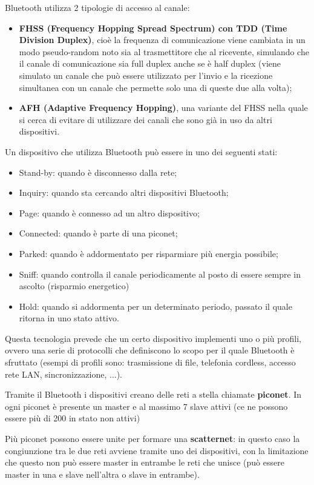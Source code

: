 Bluetooth utilizza 2 tipologie di accesso al canale:
\begin {itemize}
  \item \textbf{FHSS (Frequency Hopping Spread Spectrum) con TDD (Time Division
        Duplex)}, cioè la frequenza di comunicazione viene cambiata in un modo
        pseudo-random noto sia al trasmettitore che al ricevente, simulando che
        il canale di comunicazione sia full duplex anche se è half duplex (viene
        simulato un canale che può essere utilizzato per l'invio e la ricezione
        simultanea con un canale che permette solo una di queste due alla volta);
  \item \textbf{AFH (Adaptive Frequency Hopping)}, una variante del FHSS nella
        quale si cerca di evitare di utilizzare dei canali che sono già in uso
        da altri dispositivi.
\end{itemize}

Un dispositivo che utilizza Bluetooth può essere in uno dei seguenti stati:
\begin{itemize}
  \item Stand-by: quando è disconnesso dalla rete;
  \item Inquiry: quando sta cercando altri dispositivi Bluetooth;
  \item Page: quando è connesso ad un altro dispositivo;
  \item Connected: quando è parte di una piconet;
  \item Parked: quando è addormentato per risparmiare più energia possibile;
  \item Sniff: quando controlla il canale periodicamente al posto di essere
        sempre in ascolto (risparmio energetico)
  \item Hold: quando si addormenta per un determinato periodo, passato il quale
        ritorna in uno stato attivo.
\end{itemize}

Questa tecnologia prevede che un certo dispositivo implementi uno o più profili,
ovvero una serie di protocolli che definiscono lo scopo per il quale Bluetooth è
sfruttato (esempi di profili sono: trasmissione di file, telefonia cordless,
accesso rete LAN, sincronizzazione, ...).

Tramite il Bluetooth i dispositivi creano delle reti a stella chiamate
\textbf{piconet}. In ogni piconet è presente un master e al massimo 7 slave
attivi (ce ne possono essere più di 200 in stato non attivi)

Più piconet possono essere unite per formare una \textbf{scatternet}: in questo
caso la congiunzione tra le due reti avviene tramite uno dei dispositivi, con la
limitazione che questo non può essere master in entrambe le reti che unisce (può
essere master in una e slave nell'altra o slave in entrambe).

